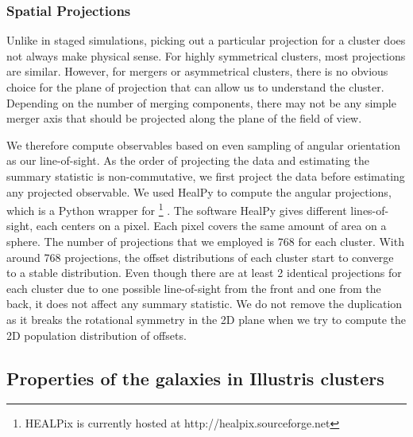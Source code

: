 \subsubsection{Spatial Projections}
\label{subsubsec:projections}
Unlike in staged simulations, picking out a particular projection for a cluster 
does not always make physical sense.
For highly symmetrical clusters, most projections are similar. 
However, for mergers or asymmetrical clusters, 
there is no obvious choice for the plane of projection that can allow us to
understand the cluster. Depending on the number of merging components, there
may not be any simple merger axis that should be 
projected along the plane of the field of view. 

We therefore compute observables based on even sampling of angular orientation 
as our line-of-sight.
As the order of projecting the data and estimating the summary statistic is
non-commutative, we first project the data before estimating any projected 
observable. 
We used {\sc HealPy} to compute the angular projections,
which is a {\sc Python} wrapper for
{} \footnote{HEALPix is
currently hosted at http://healpix.sourceforge.net}
\citep{Gorski2005}. The software {\sc HealPy} gives different
lines-of-sight, each centers on a {} 
pixel. Each pixel covers the same amount of area on a sphere. 
The number of projections that we employed is 768 for each cluster. With around 
768 projections, the offset distributions of each cluster start to converge to a
stable distribution. 
Even though there are at least 2 identical projections for each cluster due to
one possible line-of-sight from the front and one from the back, it does not
affect any summary statistic. We do not remove the duplication as it breaks
the rotational symmetry in the 2D plane when we try to compute the 2D population
distribution of offsets.  


\subsection{Properties of the galaxies in Illustris clusters}
\label{subsec:galaxy_properties}

